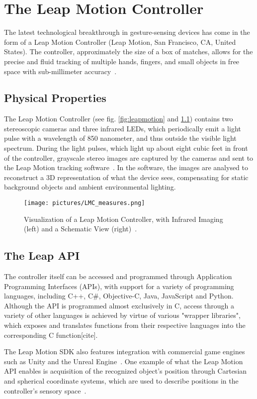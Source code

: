 \chapter{The Leap Motion Controller}
The latest technological breakthrough in gesture-sensing devices has come in the form of a Leap Motion Controller (Leap Motion, San Francisco, CA, United States). The controller, approximately the size of a box of matches, allows for the precise and fluid tracking of multiple hands, fingers, and small objects in free space with sub-millimeter accuracy~\citep{Guna2014}.

\section{Physical Properties}
The Leap Motion Controller (see fig. \ref{fig:leapmotion} and \ref{fig:leapmotion2}) contains two stereoscopic cameras and three infrared LEDs, which periodically emit a light pulse with a wavelength of 850 nanometer, and thus outside the visible light spectrum. During the light pulses, which light up about eight cubic feet in front of the controller, grayscale stereo images are captured by the cameras and sent to the Leap Motion tracking software~\citep{LeapMotion2016}. In the software, the images are analysed to reconstruct a 3D representation of what the device sees, compensating for static background objects and ambient environmental lighting. 

\begin{figure}%
	\texttt{[image: pictures/LMC\_measures.png]}
	\caption{Visualization of a Leap Motion Controller, with Infrared Imaging (left) and a Schematic View (right)~\citep{Weichert2013}.}
	\label{fig:leapmotion2}
\end{figure} 

\section{The Leap API}
The controller itself can be accessed and programmed through Application Programming Interfaces (APIs), with support for a variety of programming languages, including C++, C\#, Objective-C, Java, JavaScript and Python. Although the API is programmed almost exclusively in C, access through a variety of other languages is achieved by virtue of various "wrapper libraries", which exposes and translates functions from their respective languages into the corresponding C function[cite].

The Leap Motion SDK also features integration with commercial game engines such as Unity and the Unreal Engine~\citep{Guna2014}. One example of what the Leap Motion API enables is acquisition of the recognized object's position through Cartesian and spherical coordinate systems, which are used to describe positions in the controller's sensory space~\citep{Guna2014}.  

